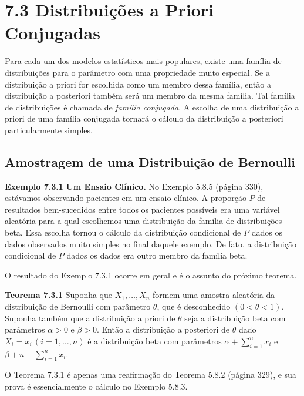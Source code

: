 \section*{7.3 Distribuições a Priori Conjugadas}
Para cada um dos modelos estatísticos mais populares, existe uma família de distribuições para o parâmetro com uma propriedade muito especial. Se a distribuição a priori for escolhida como um membro dessa família, então a distribuição a posteriori também será um membro da mesma família. Tal família de distribuições é chamada de \textit{família conjugada}. A escolha de uma distribuição a priori de uma família conjugada tornará o cálculo da distribuição a posteriori particularmente simples.

\subsection*{Amostragem de uma Distribuição de Bernoulli}

\noindent\textbf{Exemplo 7.3.1} \quad \textbf{Um Ensaio Clínico.} No Exemplo 5.8.5 (página 330), estávamos observando pacientes em um ensaio clínico. A proporção $P$ de resultados bem-sucedidos entre todos os pacientes possíveis era uma variável aleatória para a qual escolhemos uma distribuição da família de distribuições beta. Essa escolha tornou o cálculo da distribuição condicional de $P$ dados os dados observados muito simples no final daquele exemplo. De fato, a distribuição condicional de $P$ dados os dados era outro membro da família beta.

O resultado do Exemplo 7.3.1 ocorre em geral e é o assunto do próximo teorema.

\vspace{1cm}
\noindent\textbf{Teorema 7.3.1} \quad Suponha que $X_1, \dots, X_n$ formem uma amostra aleatória da distribuição de Bernoulli com parâmetro $\theta$, que é desconhecido $(0 < \theta < 1)$. Suponha também que a distribuição a priori de $\theta$ seja a distribuição beta com parâmetros $\alpha > 0$ e $\beta > 0$. Então a distribuição a posteriori de $\theta$ dado $X_i = x_i \, (i=1, \dots, n)$ é a distribuição beta com parâmetros $\alpha + \sum_{i=1}^{n}x_i$ e $\beta + n - \sum_{i=1}^{n}x_i$.

O Teorema 7.3.1 é apenas uma reafirmação do Teorema 5.8.2 (página 329), e sua prova é essencialmente o cálculo no Exemplo 5.8.3.

